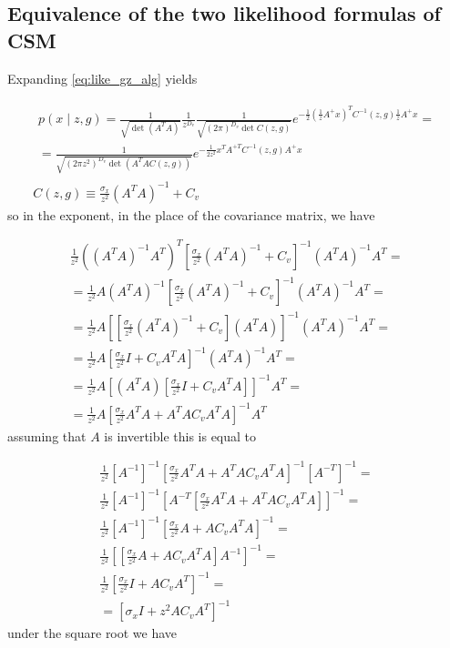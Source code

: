 \documentclass{paper}
\begin{document}
\subsection{Equivalence of the two likelihood formulas of CSM} \label{seq:like_equiv}

Expanding \ref{eq:like_gz_alg} yields

\begin{eqnarray}
\begin{split}
p(x \mid z,g) = \frac{1}{\sqrt{\det(A^TA)}} \frac{1}{z^{D_v}} \frac{1}{\sqrt{ (2\pi)^{D_v} \det C(z,g) }} e^{-\frac{1}{2} \left( \frac{1}{z}A^{+}x \right)^T C^{-1}(z,g) \frac{1}{z}A^{+}x}  = \\
= \frac{1}{\sqrt{ (2\pi z^2)^{D_v} \det(A^TA C(z,g))}} e^{-\frac{1}{2z^2} x^TA^{+T} C^{-1}(z,g) A^{+}x}
\end{split} \\
C(z,g) \equiv \frac{\sigma_x}{z^2} (A^TA)^{-1} + C_v
\end{eqnarray}
%
so in the exponent, in the place of the covariance matrix, we have

\begin{equation}
\begin{split}
\frac{1}{z^2} \left( (A^TA)^{-1}A^T \right)^T \left[  \frac{\sigma_x}{z^2} (A^TA)^{-1} + C_v  \right]^{-1} (A^TA)^{-1}A^T = \\
= \frac{1}{z^2} A (A^TA)^{-1} \left[  \frac{\sigma_x}{z^2} (A^TA)^{-1} + C_v  \right]^{-1} (A^TA)^{-1}A^T = \\
= \frac{1}{z^2} A \left[ \left[ \frac{\sigma_x}{z^2} (A^TA)^{-1} + C_v \right] (A^TA) \right]^{-1} (A^TA)^{-1}A^T = \\
= \frac{1}{z^2} A \left[ \frac{\sigma_x}{z^2} I + C_v A^TA \right]^{-1} (A^TA)^{-1}A^T = \\
= \frac{1}{z^2} A \left[ (A^TA) \left[ \frac{\sigma_x}{z^2} I + C_v A^TA \right] \right]^{-1} A^T = \\
= \frac{1}{z^2} A  \left[ \frac{\sigma_x}{z^2} A^TA + A^TA C_v A^TA \right]^{-1} A^T
\end{split}
\end{equation}
%
assuming that $A$ is invertible this is equal to

\begin{equation}
\begin{split}
\frac{1}{z^2} \left[ A^{-1}\right]^{-1}  \left[ \frac{\sigma_x}{z^2} A^TA + A^TA C_v A^TA \right]^{-1} \left[ A^{-T}\right]^{-1} = \\
\frac{1}{z^2} \left[ A^{-1}\right]^{-1}  \left[ A^{-T} \left[ \frac{\sigma_x}{z^2} A^TA + A^TA C_v A^TA \right] \right]^{-1} = \\
\frac{1}{z^2} \left[ A^{-1}\right]^{-1}  \left[ \frac{\sigma_x}{z^2} A + A C_v A^TA \right]^{-1} = \\
\frac{1}{z^2} \left[  \left[ \frac{\sigma_x}{z^2} A + A C_v A^TA\right] A^{-1} \right]^{-1} = \\
\frac{1}{z^2} \left[ \frac{\sigma_x}{z^2} I + A C_v A^T\right]^{-1} = \\
= \left[ \sigma_x I + z^2 A C_v A^T \right]^{-1}
\end{split}
\end{equation}
%
under the square root we have
\end{document}
